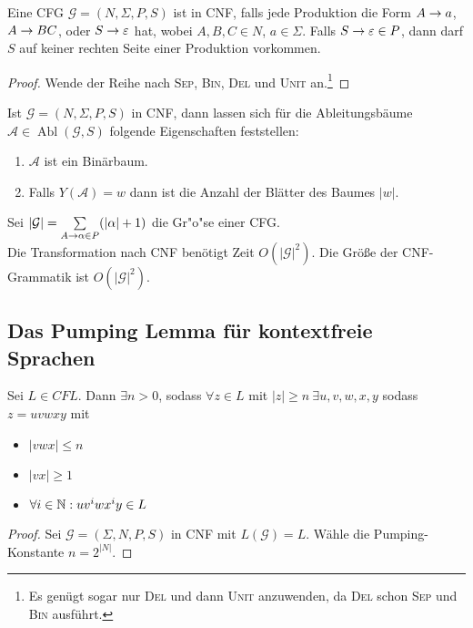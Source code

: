 {\begin{Def}[name={[\acs*{CFG} in \acs*{CNF}]}]
	Eine \ac{CFG} $\mathcal{G} = (N, \Sigma, P, S)$ ist in \ac{CNF}, falls jede
  Produktion die Form $A\->a$, $A\->BC$, oder $S \-> \Eps$ hat, wobei $A,B,C\in N$, $a\in\Sigma$.
  Falls $S \to \varepsilon \in P$, dann darf $S$ auf keiner rechten Seite einer Produktion vorkommen.
\end{Def}
\begin{proof}
    Wende der Reihe nach \textsc{Sep}, \textsc{Bin}, \textsc{Del} und \textsc{Unit} an.\footnote{Es genügt sogar nur \textsc{Del} und dann \textsc{Unit} anzuwenden, da \textsc{Del} schon \textsc{Sep} und \textsc{Bin} ausführt.}
\end{proof}

\begin{Beobachtung}
  Ist $\mathcal{G} = (N, \Sigma, P, S)$ in CNF, dann lassen sich für die Ableitungsbäume $\mathcal{A} \in \operatorname{Abl}(\mathcal{G}, S)$ folgende Eigenschaften feststellen:
  \begin{enumerate}
  \item $\mathcal{A}$ ist ein Binärbaum. 
  \item Falls $Y(\mathcal{A}) = w$ dann ist die Anzahl der Blätter des Baumes $|w|$.		%
  \end{enumerate}
\end{Beobachtung}
	
\begin{Bemerkung} Sei $|\mathcal{G}|=\sum\limits_{A\->\alpha\in P}(|\alpha|+1)$ die Gr"o"se einer CFG.\\
Die Transformation nach \ac{CNF} benötigt Zeit $O(|\mathcal{G}|^2)$. Die Größe der \ac{CNF}-Grammatik ist $O(|\mathcal{G}|^2)$.
\end{Bemerkung}

\subsection{Das Pumping Lemma für kontextfreie Sprachen}
\begin{Satz}
\label{satz:PL für CFL}
	Sei $L\in {CFL}$. Dann $\exists n>0$, sodass $\forall z\in L$ mit $|z|\geq n\ \exists u,v,w,x,y$ sodass $z=uvwxy$ mit
	\begin{itemize}
	\item $|vwx|\leq n$
	\item $|vx|\geq 1$
	\item $\forall i \in \mathbb{N} : uv^iwx^iy\in L$
	\end{itemize}
\end{Satz}
\begin{proof}
	Sei $\mathcal{G}= (\Sigma,N,P,S)$ in \ac{CNF} mit
    $L(\mathcal{G}) = L$. Wähle die Pumping-Konstante $n=2^{|N|}$.
    

\end{proof}}
